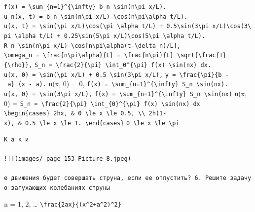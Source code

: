 \documentclass[
  ukrainian,
]{article}
\begin{document}
\texttt{f(x)\ =\ \textbackslash{}sum\_\{n=1\}\^{}\{\textbackslash{}infty\}\ b\_n\ \textbackslash{}sin(n\textbackslash{}pi\ x/L).}
\texttt{u\_n(x,\ t)\ =\ b\_n\ \textbackslash{}sin(n\textbackslash{}pi\ x/L)\ \textbackslash{}cos(n\textbackslash{}pi\textbackslash{}alpha\ t/L).}
\texttt{u(x,\ t)\ =\ \textbackslash{}sin(\textbackslash{}pi\ x/L)\textbackslash{}cos(\textbackslash{}pi\ \textbackslash{}alpha\ t/L)\ +\ 0.5\textbackslash{}sin(3\textbackslash{}pi\ x/L)\textbackslash{}cos(3\textbackslash{}pi\ \textbackslash{}alpha\ t/L)\ +\ 0.25\textbackslash{}sin(5\textbackslash{}pi\ x/L)\textbackslash{}cos(5\textbackslash{}pi\ \textbackslash{}alpha\ t/L).}
\texttt{R\_n\ \textbackslash{}sin(n\textbackslash{}pi\ x/L)\ \textbackslash{}cos{[}n\textbackslash{}pi\textbackslash{}alpha(t-\textbackslash{}delta\_n)/L{]},}
\texttt{\textbackslash{}omega\_n\ =\ \textbackslash{}frac\{n\textbackslash{}pi\textbackslash{}alpha\}\{L\}\ =\ \textbackslash{}frac\{n\textbackslash{}pi\}\{L\}\ \textbackslash{}sqrt\{\textbackslash{}frac\{T\}\{\textbackslash{}rho\}\},}
\texttt{S\_n\ =\ \textbackslash{}frac\{2\}\{\textbackslash{}pi\}\ \textbackslash{}int\_0\^{}\{\textbackslash{}pi\}\ f(x)\ \textbackslash{}sin(nx)\ dx.}
\texttt{u(x,\ 0)\ =\ \textbackslash{}sin(\textbackslash{}pi\ x/L)\ +\ 0.5\ \textbackslash{}sin(3\textbackslash{}pi\ x/L),}
\texttt{y\ =\ \textbackslash{}frac\{\textbackslash{}pi\}\{b\ -\ a\}\ (x\ -\ a).}
u(x, 0) = 0,
\texttt{f(x)\ =\ \textbackslash{}sum\_\{n=1\}\^{}\{\textbackslash{}infty\}\ S\_n\ \textbackslash{}sin(nx).}
\texttt{u(x,\ 0)\ =\ \textbackslash{}sin(3\textbackslash{}pi\ x/L),}
\texttt{f(x)\ =\ \textbackslash{}sum\_\{n=1\}\^{}\{\textbackslash{}infty\}\ S\_n\ \textbackslash{}sin(nx)}
u(x, 0) =
\texttt{S\_n\ =\ \textbackslash{}frac\{2\}\{\textbackslash{}pi\}\ \textbackslash{}int\_\{0\}\^{}\{\textbackslash{}pi\}\ f(x)\ \textbackslash{}sin(nx)\ dx}
\texttt{\textbackslash{}begin\{cases\}\ 2hx,\ \&\ 0\ \textbackslash{}le\ x\ \textbackslash{}le\ 0.5,\ \textbackslash{}\textbackslash{}\ 2h(1-x),\ \&\ 0.5\ \textbackslash{}le\ x\ \textbackslash{}le\ 1.\ \textbackslash{}end\{cases\}}
\texttt{0\ \textbackslash{}le\ x\ \textbackslash{}le\ \textbackslash{}pi}

\begin{verbatim}
К а к и

![](images/_page_153_Picture_8.jpeg)

е движения будет совершать струна, если ее отпустить? 6. Решите задачу о затухающих колебаниях струны
\end{verbatim}

n = 1, 2, \ldots{}
\texttt{\textbackslash{}frac\{2ax\}\{(x\^{}2+a\^{}2)\^{}2\}}
\end{document}
